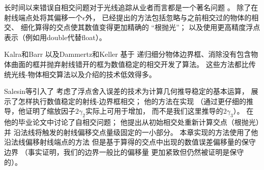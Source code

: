 长时间以来错误自相交问题对于光线追踪从业者而言都是一个著名问题
\citep{10.5555/94788.94790,Amanatides1990:27}。
除了在射线端点处将其偏移一个$\epsilon$外，
已经提出的方法包括忽略与之前相交过的物体的相交、
细化算得的交点使其数值变得更加精确的
“根抛光”\citep{10.5555/94788.94790,536271}；
以及使用更高精度浮点表示（例如用{\ttfamily double}代替{\ttfamily float}）。

Kalra和Barr \parencite*{10.1145/74333.74364}以及Dammertz和Keller \parencite*{4061542}基于
递归细分物体边界框、消除没有包含物体曲面的框并抛弃射线错开的框为数值稳定的相交开发了算法。
这些方法都比传统光线-物体相交算法以及介绍的技术低效得多。

Salesin等\parencite*{10.1145/73833.73857}引入了
考虑了浮点舍入误差的技术为计算几何推导稳定的基本运算，
\citet{Ize2013BVH}展示了怎样执行数值稳定的射线-边界框相交；
他的方法在实现
（通过更仔细的推导，他证明了缩放因子$2\gamma_2$实际上可用于增加，
而不是我们这里推导的$2\gamma_3$）。
\citet{Wächter_2008}在他的毕业论文中讨论了自相交问题；
他提出从初始相交处重新计算交点（根抛光）并
沿法线将触发的射线偏移交点量级固定的一小部分。
本章实现的方法使用了他沿法线偏移射线端点的方法
但是基于算得的交点中出现的数值误差偏移量的保守边界
（事实证明，我们的边界一般比\citeauthor{Wächter_2008}的偏移量
更加紧致但仍然被证明是保守的）。
